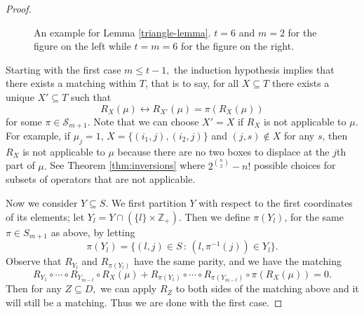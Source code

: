 \documentclass[10pt,a4paper]{amsart}
\begin{document}
\begin{proof}
\begin{figure}
\caption{An example for Lemma \ref{triangle-lemma}. $t=6$ and $m=2$ for the figure on the left while $t=m=6$ for the figure on the right.}
\label{triangle}
\end{figure}


 
Starting with the first case $m \leq t-1,$ the induction hypothesis implies that there exists a matching within $T$, that is to say, for all $X \subseteq T$ there exists a unique $X' \subseteq T$ such that
\begin{equation} \label{match}
 R_X(\mu) \leftrightarrow R_{X'}(\mu) = \pi(R_X(\mu))   
\end{equation}
for some $\pi \in \mathcal{S}_{m+1}.$ Note that we can choose $X'=X$ if $R_X$ is not applicable to $\mu.$ For example, if $\mu_j=1$, $X=\{(i_1,j),(i_2,j)\}$ and $(j,s)\notin X$ for any $s$,  then $R_X$ is not applicable to $\mu$ because there are no two boxes to displace at the $j$th part of $\mu.$ See 
Theorem \ref{thm:inversions} where $2^{\binom{n}{2}}-n!$ possible choices for subsets of operators that are not applicable.

 
Now we consider $Y \subseteq S.$ We first partition $Y$ with respect to the first coordinates of its elements; let $Y_l =Y \cap (\{l\}\times \mathbb{Z}_+).$ Then we define $\pi(Y_l)$, for the same $\pi\in S_{m+1}$ as above, by letting 
\[\pi(Y_l)=\{(l,j) \in S \, : \, (l,\pi^{-1}(j)) \in Y_l\}.\] 
 Observe that $R_{Y_l}$ and $R_{\pi(Y_l)}$ have the same parity, and we have the matching 
    \[R_{Y_1} \circ \cdots \circ R_{Y_{m-t}} \circ R_X(\mu)  +R_{\pi(Y_1)} \circ \cdots \circ R_{\pi(Y_{m-t})}  \circ \pi(R_X(\mu))=0.\]
 Then for any $Z \subseteq D,$ we can apply $R_Z$ to both sides of the matching above and it will still be a matching. Thus we are done with the first case.


\end{proof}
\end{document}
